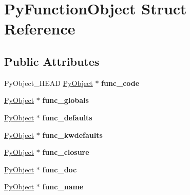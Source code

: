 \hypertarget{structPyFunctionObject}{}\section{Py\+Function\+Object Struct Reference}
\label{structPyFunctionObject}
\subsection*{Public Attributes}
\begin{DoxyCompactItemize}
\item 
Py\+Object\+\_\+\+H\+E\+AD \hyperlink{struct__object}{Py\+Object} $\ast$ {\bfseries func\+\_\+code}\hypertarget{structPyFunctionObject_a6c5f4d38976ab36a863e6e5d03581cd1}{}\label{structPyFunctionObject_a6c5f4d38976ab36a863e6e5d03581cd1}

\item 
\hyperlink{struct__object}{Py\+Object} $\ast$ {\bfseries func\+\_\+globals}\hypertarget{structPyFunctionObject_a236accb7c482a4e856b70b8fb082debd}{}\label{structPyFunctionObject_a236accb7c482a4e856b70b8fb082debd}

\item 
\hyperlink{struct__object}{Py\+Object} $\ast$ {\bfseries func\+\_\+defaults}\hypertarget{structPyFunctionObject_ae6c99ddf86631063aaeb760e324036fd}{}\label{structPyFunctionObject_ae6c99ddf86631063aaeb760e324036fd}

\item 
\hyperlink{struct__object}{Py\+Object} $\ast$ {\bfseries func\+\_\+kwdefaults}\hypertarget{structPyFunctionObject_ab0c1ae70b61a168d69e90369f3b31849}{}\label{structPyFunctionObject_ab0c1ae70b61a168d69e90369f3b31849}

\item 
\hyperlink{struct__object}{Py\+Object} $\ast$ {\bfseries func\+\_\+closure}\hypertarget{structPyFunctionObject_aafd3e2863284c80370b4fefa2116e120}{}\label{structPyFunctionObject_aafd3e2863284c80370b4fefa2116e120}

\item 
\hyperlink{struct__object}{Py\+Object} $\ast$ {\bfseries func\+\_\+doc}\hypertarget{structPyFunctionObject_aae1ad9ce5d3f2951306948a08f4c12dd}{}\label{structPyFunctionObject_aae1ad9ce5d3f2951306948a08f4c12dd}

\item 
\hyperlink{struct__object}{Py\+Object} $\ast$ {\bfseries func\+\_\+name}\hypertarget{structPyFunctionObject_a5667a7154d870b8644a469a735283fc8}{}\label{structPyFunctionObject_a5667a7154d870b8644a469a735283fc8}


\end{DoxyCompactItemize}
